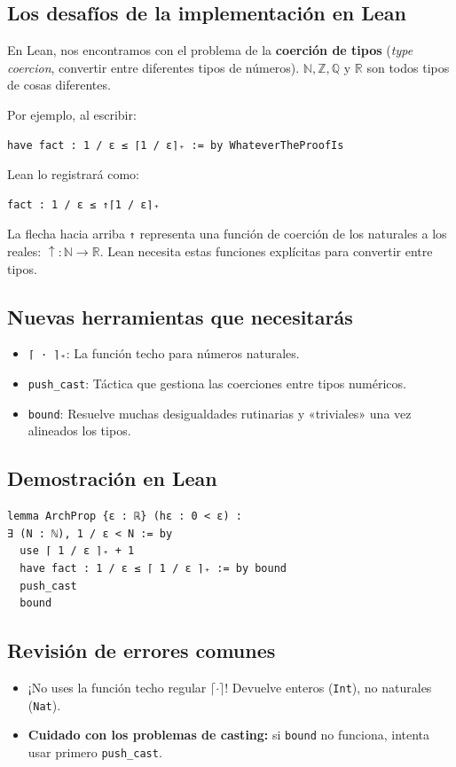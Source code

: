 \documentclass[a4paper,12pt,twoside]{book}
\begin{document}
\subsection{Los desafíos de la implementación en Lean}
\label{sec:org7984489}

En Lean, nos encontramos con el problema de la \textbf{coerción de tipos} (\emph{type
coercion}, convertir entre diferentes tipos de números). \(\mathbb{N},
\mathbb{Z}, \mathbb{Q}\) y \(\mathbb{R}\) son todos tipos de cosas
diferentes.

Por ejemplo, al escribir:
\begin{verbatim}
have fact : 1 / ε ≤ ⌈1 / ε⌉₊ := by WhateverTheProofIs
\end{verbatim}

Lean lo registrará como:
\begin{verbatim}
fact : 1 / ε ≤ ↑⌈1 / ε⌉₊
\end{verbatim}

La flecha hacia arriba \texttt{↑} representa una función de coerción de los
naturales a los reales: \(↑ : \mathbb{N} \to \mathbb{R}\). Lean necesita
estas funciones explícitas para convertir entre tipos.

\subsection{Nuevas herramientas que necesitarás}
\label{sec:org5613c60}

\begin{itemize}
\item \texttt{⌈ · ⌉₊}: La función techo para números naturales.
\item \texttt{push\_cast}: Táctica que gestiona las coerciones entre tipos numéricos.
\item \texttt{bound}: Resuelve muchas desigualdades rutinarias y «triviales» una vez
alineados los tipos.
\end{itemize}

\subsection{Demostración en Lean}
\label{sec:org6430881}

\begin{verbatim}
lemma ArchProp {ε : ℝ} (hε : 0 < ε) :
∃ (N : ℕ), 1 / ε < N := by
  use ⌈ 1 / ε ⌉₊ + 1
  have fact : 1 / ε ≤ ⌈ 1 / ε ⌉₊ := by bound
  push_cast
  bound
\end{verbatim}

\subsection{Revisión de errores comunes}
\label{sec:orgfe1a633}

\begin{itemize}
\item ¡No uses la función techo regular \(\lceil \cdot \rceil\)! Devuelve
enteros (\texttt{Int}), no naturales (\texttt{Nat}).
\item \textbf{Cuidado con los problemas de casting:} si \texttt{bound} no funciona, intenta
usar primero \texttt{push\_cast}.
\end{itemize}
\end{document}
